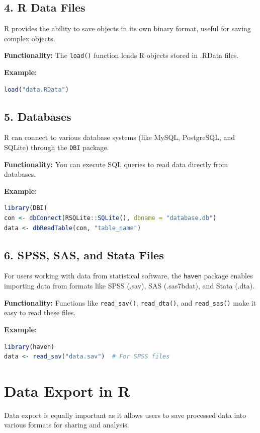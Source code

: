 \documentclass[10pt]{book}
\begin{document}
\subsection{4. R Data Files}
R provides the ability to save objects in its own binary format, useful for saving complex objects.

\textbf{Functionality:} The \texttt{load()} function loads R objects stored in .RData files.

\textbf{Example:}
\begin{lstlisting}[language=R]
load("data.RData")
\end{lstlisting}

\subsection{5. Databases}
R can connect to various database systems (like MySQL, PostgreSQL, and SQLite) through the \texttt{DBI} package.

\textbf{Functionality:} You can execute SQL queries to read data directly from databases.

\textbf{Example:}
\begin{lstlisting}[language=R]
library(DBI)
con <- dbConnect(RSQLite::SQLite(), dbname = "database.db")
data <- dbReadTable(con, "table_name")
\end{lstlisting}

\subsection{6. SPSS, SAS, and Stata Files}
For users working with data from statistical software, the \texttt{haven} package enables importing data from formats like SPSS (.sav), SAS (.sas7bdat), and Stata (.dta).

\textbf{Functionality:} Functions like \texttt{read\_sav()}, \texttt{read\_dta()}, and \texttt{read\_sas()} make it easy to read these files.

\textbf{Example:}
\begin{lstlisting}[language=R]
library(haven)
data <- read_sav("data.sav")  # For SPSS files
\end{lstlisting}

\section{Data Export in R}
Data export is equally important as it allows users to save processed data into various formats for sharing and analysis.
\end{document}
